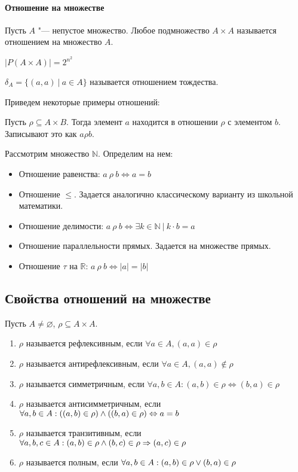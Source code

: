\paragraph{Отношение на множестве}

Пусть $A$ "--- непустое множество. Любое подмножество $A \times A$
называется отношением на множество $A$.

$|P(A \times A)| = 2^{n^2}$

$\delta_A = \{(a, a) ~|~ a \in A\}$ называется отношением тождества.

Приведем некоторые примеры отношений:

\begin{definition}
    Пусть $\rho \subseteq A \times B$.
    Тогда элемент $a$ находится в отношении $\rho$ с элементом $b$. Записывают это как $a \rho b$.
\end{definition}

\begin{example}
    Рассмотрим множество $\mathbb{N}$. Определим на нем:
    \begin{itemize}
        \item Отношение равенства: $a ~ \rho ~ b \Leftrightarrow a = b$
        \item Отношение $\leq$. Задается аналогично классическому варианту из школьной математики.
        \item Отношение делимости: $a ~\rho~ b \Leftrightarrow \exists k \in \mathbb{N} ~|~ k \cdot b = a$
        \item Отношение параллельности прямых. Задается на множестве прямых.
        \item Отношение $\tau$ на $\mathbb{R}$: $a ~ \rho ~ b \Leftrightarrow |a|  =  |b|$
    \end{itemize}
\end{example}

\subsection{Свойства отношений на множестве}

Пусть $A \neq \varnothing$, $\rho \subseteq A \times A$.

\begin{enumerate}
    \item $\rho$ называется рефлексивным, если $\forall a \in A, (a, a) \in \rho$
    \item $\rho$ называется антирефлексивным, если $\forall a \in A, (a, a) \notin \rho$
    \item $\rho$ называется симметричным, если 
    $\forall a, b \in A: (a, b) \in \rho \Leftrightarrow (b, a) \in \rho$
    \item $\rho$ называется антисимметричным, если
    $\forall a, b \in A: ((a, b) \in \rho) \wedge ((b, a) \in \rho) \Leftrightarrow a = b$
    \item $\rho$ называется транзитивным, если 
    $\forall a, b, c \in A: (a, b) \in \rho \wedge (b, c) \in \rho \Rightarrow (a, c) \in \rho$
    \item $\rho$ называется полным, если $\forall a,b \in A: (a, b) \in \rho \vee (b, a) \in \rho$
\end{enumerate}

